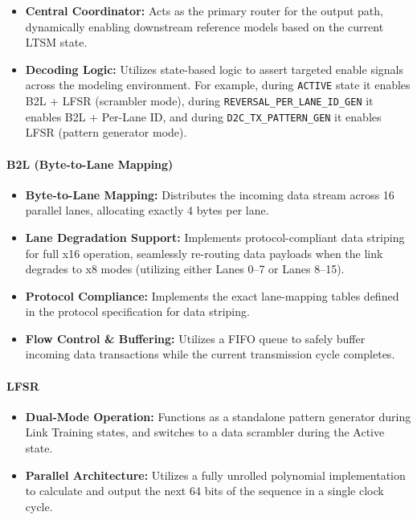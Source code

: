 \documentclass[11pt,a4paper]{article}
\begin{document}
\begin{itemize}
  \item \textbf{Central Coordinator:} Acts as the primary router for the output path, dynamically enabling downstream reference models based on the current LTSM state.
  \item \textbf{Decoding Logic:} Utilizes state-based logic to assert targeted enable signals across the modeling environment. For example, during \texttt{ACTIVE} state it enables B2L + LFSR (scrambler mode), during \texttt{REVERSAL\_PER\_LANE\_ID\_GEN} it enables B2L + Per-Lane ID, and during \texttt{D2C\_TX\_PATTERN\_GEN} it enables LFSR (pattern generator mode).
\end{itemize}


\paragraph{B2L (Byte-to-Lane Mapping)}

\begin{itemize}
  \item \textbf{Byte-to-Lane Mapping:} Distributes the incoming data stream across 16 parallel lanes, allocating exactly 4 bytes per lane.
  \item \textbf{Lane Degradation Support:} Implements protocol-compliant data striping for full x16 operation, seamlessly re-routing data payloads when the link degrades to x8 modes (utilizing either Lanes 0--7 or Lanes 8--15).
  \item \textbf{Protocol Compliance:} Implements the exact lane-mapping tables defined in the protocol specification for data striping.
  \item \textbf{Flow Control \& Buffering:} Utilizes a FIFO queue to safely buffer incoming data transactions while the current transmission cycle completes.
\end{itemize}


\paragraph{LFSR}

\begin{itemize}
  \item \textbf{Dual-Mode Operation:} Functions as a standalone pattern generator during Link Training states, and switches to a data scrambler during the Active state.
  \item \textbf{Parallel Architecture:} Utilizes a fully unrolled polynomial implementation to calculate and output the next 64 bits of the sequence in a single clock cycle.
\end{itemize}
\end{document}
